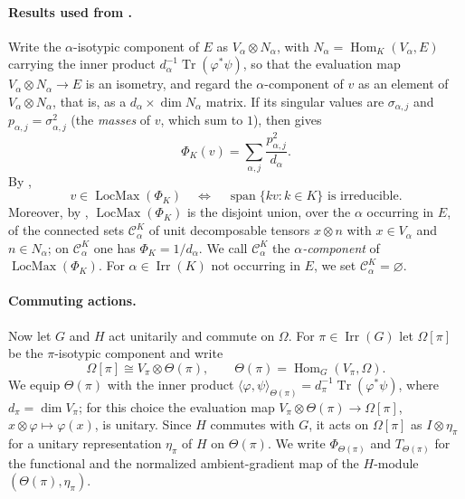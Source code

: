 \documentclass[10pt]{amsart}
\theoremstyle{remark}
\DeclareMathOperator{\Irr}{Irr}
\DeclareMathOperator{\Hom}{Hom}
\DeclareMathOperator{\Tr}{Tr}
\DeclareMathOperator{\Span}{span}
\DeclareMathOperator{\LocMax}{LocMax}
\newcommand{\ip}[2]{\langle #1,#2\rangle}
\begin{document}
\paragraph{Results used from \cite{HungKang2026}.}
Write the $\alpha$-isotypic component of $E$ as
$V_\alpha\otimes N_\alpha$, with $N_\alpha=\Hom_K(V_\alpha,E)$ carrying the inner product
$d_\alpha^{-1}\Tr(\varphi^*\psi)$, so that the evaluation map $V_\alpha\otimes N_\alpha\to E$ is an
isometry, and regard the $\alpha$-component of $v$ as
an element of $V_\alpha\otimes N_\alpha$, that is, as a $d_\alpha\times\dim N_\alpha$ matrix. If its
singular values are $\sigma_{\alpha,j}$ and $p_{\alpha,j}=\sigma_{\alpha,j}^2$ (the \emph{masses} of $v$, which
sum to $1$), then \cite[Lemma~1(c)]{HungKang2026} gives
\begin{equation}\label{eq:singular-formula}
 \Phi_K(v)=\sum_{\alpha,j}\frac{p_{\alpha,j}^2}{d_\alpha}.
\end{equation}
By \cite[Theorem~3]{HungKang2026},
\begin{equation}\label{eq:criterion}
 v\in\LocMax(\Phi_K)
 \quad\Longleftrightarrow\quad
 \Span\{kv:k\in K\}\text{ is irreducible}.
\end{equation}
Moreover, by \cite[Corollary~4]{HungKang2026}, $\LocMax(\Phi_K)$ is the disjoint union,
over the $\alpha$ occurring in $E$, of the connected sets
$\mathcal C_\alpha^K$ of unit decomposable tensors $x\otimes n$ with $x\in V_\alpha$ and $n\in N_\alpha$; on
$\mathcal C_\alpha^K$ one has $\Phi_K=1/d_\alpha$. We call $\mathcal C_\alpha^K$ the
\emph{$\alpha$-component} of $\LocMax(\Phi_K)$.
For $\alpha\in\Irr(K)$ not occurring in $E$, we set $\mathcal C_\alpha^K=\varnothing$.

\paragraph{Commuting actions.}
Now let $G$ and $H$ act unitarily and commute on $\Omega$. For
$\pi\in\Irr(G)$ let $\Omega[\pi]$ be the $\pi$-isotypic component and write
\begin{equation}\label{eq:theta-module}
 \Omega[\pi]\cong V_\pi\otimes\Theta(\pi),
 \qquad
 \Theta(\pi)=\Hom_G(V_\pi,\Omega).
\end{equation}
We equip $\Theta(\pi)$ with the inner product
$\ip{\varphi}{\psi}_{\Theta(\pi)}=d_\pi^{-1}\Tr(\varphi^*\psi)$, where $d_\pi=\dim V_\pi$; for this
choice the evaluation map $V_\pi\otimes\Theta(\pi)\to\Omega[\pi]$, $x\otimes\varphi\mapsto\varphi(x)$,
is unitary. Since $H$ commutes with $G$, it acts on $\Omega[\pi]$ as $I\otimes\eta_\pi$ for a unitary
representation $\eta_\pi$ of $H$ on $\Theta(\pi)$. We write $\Phi_{\Theta(\pi)}$ and $T_{\Theta(\pi)}$ for the
functional and the normalized ambient-gradient map of the $H$-module $(\Theta(\pi),\eta_\pi)$.
\end{document}
